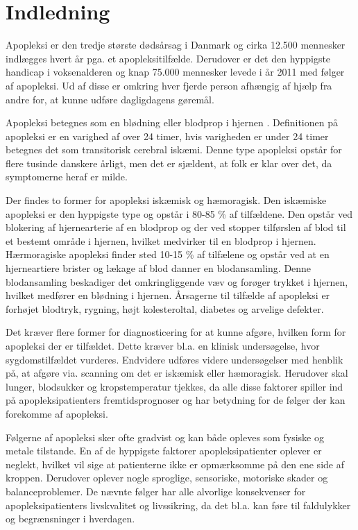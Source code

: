 \section{Indledning}
Apopleksi er den tredje største dødsårsag i Danmark og cirka 12.500 mennesker indlægges hvert år pga. et apopleksitilfælde. Derudover er det den hyppigste handicap i voksenalderen og knap 75.000 mennesker levede i år 2011 med følger af apopleksi. Ud af disse er omkring hver fjerde person afhængig af hjælp fra andre for, at kunne udføre dagligdagens gøremål. \cite{Hjernesagen2015a}

Apopleksi betegnes som en blødning eller blodprop i hjernen \cite{Hjernesagen2015a}. Definitionen på apopleksi er en varighed af over 24 timer, hvis varigheden er under 24 timer betegnes det som transitorisk cerebral iskæmi. Denne type apopleksi opstår for flere tusinde danskere årligt, men det er sjældent, at folk er klar over det, da symptomerne heraf er milde.

Der findes to former for apopleksi iskæmisk og hæmoragisk.
Den iskæmiske apopleksi er den hyppigste type og opstår i 80-85 \% af tilfældene. Den opstår ved blokering af hjernearterie af en blodprop og der ved stopper tilførslen af blod til et bestemt område i hjernen, hvilket medvirker til en blodprop i hjernen.
Hærmoragiske apopleksi finder sted 10-15 \% af tilfælene og opstår ved at en hjerneartiere brister og lækage af blod danner en blodansamling. Denne blodansamling beskadiger det omkringliggende væv og forøger trykket i hjernen, hvilket medfører en blødning i hjernen. Årsagerne til tilfælde af apopleksi er forhøjet blodtryk, rygning, højt kolesteroltal, diabetes og arvelige defekter.

Det kræver flere former for diagnosticering for at kunne afgøre, hvilken form for apopleksi der er tilfældet. Dette kræver bl.a. en klinisk undersøgelse, hvor sygdomstilfældet vurderes. Endvidere udføres videre undersøgelser med henblik på, at afgøre  via. scanning om det er iskæmisk eller hæmoragisk. Herudover skal lunger, blodsukker og kropstemperatur tjekkes, da alle disse faktorer spiller ind på apopleksipatienters fremtidsprognoser og har betydning for de følger der kan forekomme af apopleksi. 

Følgerne af apopleksi sker ofte gradvist og kan både opleves som fysiske og metale tilstande. En af de hyppigste faktorer apopleksipatienter oplever er neglekt, hvilket vil sige at patienterne ikke er opmærksomme på den ene side af kroppen. Derudover oplever nogle sproglige, sensoriske, motoriske skader og balanceproblemer. De nævnte følger har alle alvorlige konsekvenser for apopleksipatienters livskvalitet og livssikring, da det bl.a. kan føre til faldulykker og begrænsninger i hverdagen. 

